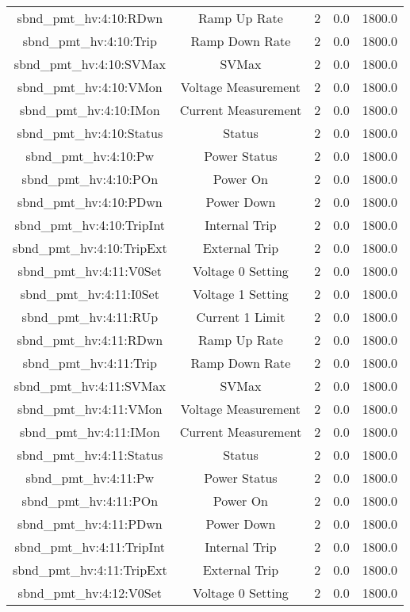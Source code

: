 \begin{table}[ptb]
\begin{tabular}{c | c c c c}
sbnd_pmt_hv:4:10:RDwn & Ramp Up Rate & 2 & 0.0 & 1800.0\\ 
sbnd_pmt_hv:4:10:Trip & Ramp Down Rate & 2 & 0.0 & 1800.0\\ 
sbnd_pmt_hv:4:10:SVMax & SVMax & 2 & 0.0 & 1800.0\\ 
sbnd_pmt_hv:4:10:VMon & Voltage Measurement & 2 & 0.0 & 1800.0\\ 
sbnd_pmt_hv:4:10:IMon & Current Measurement & 2 & 0.0 & 1800.0\\ 
sbnd_pmt_hv:4:10:Status & Status & 2 & 0.0 & 1800.0\\ 
sbnd_pmt_hv:4:10:Pw & Power Status & 2 & 0.0 & 1800.0\\ 
sbnd_pmt_hv:4:10:POn & Power On & 2 & 0.0 & 1800.0\\ 
sbnd_pmt_hv:4:10:PDwn & Power Down & 2 & 0.0 & 1800.0\\ 
sbnd_pmt_hv:4:10:TripInt & Internal Trip & 2 & 0.0 & 1800.0\\ 
sbnd_pmt_hv:4:10:TripExt & External Trip & 2 & 0.0 & 1800.0\\ 
sbnd_pmt_hv:4:11:V0Set & Voltage 0 Setting & 2 & 0.0 & 1800.0\\ 
sbnd_pmt_hv:4:11:I0Set & Voltage 1 Setting & 2 & 0.0 & 1800.0\\ 
sbnd_pmt_hv:4:11:RUp & Current 1 Limit & 2 & 0.0 & 1800.0\\ 
sbnd_pmt_hv:4:11:RDwn & Ramp Up Rate & 2 & 0.0 & 1800.0\\ 
sbnd_pmt_hv:4:11:Trip & Ramp Down Rate & 2 & 0.0 & 1800.0\\ 
sbnd_pmt_hv:4:11:SVMax & SVMax & 2 & 0.0 & 1800.0\\ 
sbnd_pmt_hv:4:11:VMon & Voltage Measurement & 2 & 0.0 & 1800.0\\ 
sbnd_pmt_hv:4:11:IMon & Current Measurement & 2 & 0.0 & 1800.0\\ 
sbnd_pmt_hv:4:11:Status & Status & 2 & 0.0 & 1800.0\\ 
sbnd_pmt_hv:4:11:Pw & Power Status & 2 & 0.0 & 1800.0\\ 
sbnd_pmt_hv:4:11:POn & Power On & 2 & 0.0 & 1800.0\\ 
sbnd_pmt_hv:4:11:PDwn & Power Down & 2 & 0.0 & 1800.0\\ 
sbnd_pmt_hv:4:11:TripInt & Internal Trip & 2 & 0.0 & 1800.0\\ 
sbnd_pmt_hv:4:11:TripExt & External Trip & 2 & 0.0 & 1800.0\\ 
sbnd_pmt_hv:4:12:V0Set & Voltage 0 Setting & 2 & 0.0 & 1800.0\\ 

\end{tabular}
\end{table}
